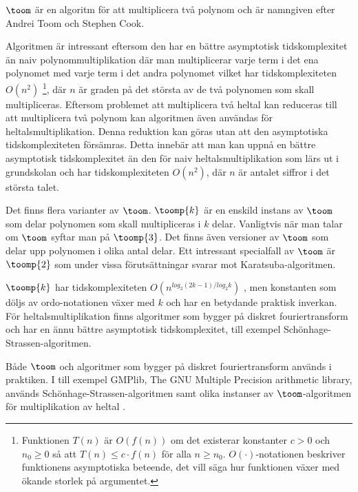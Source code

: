 $\toom$ är en algoritm för att multiplicera två polynom och är namngiven efter
Andrei Toom och Stephen Cook.

Algoritmen är intressant eftersom den har en bättre asymptotisk tidskomplexitet
än naiv polynommultiplikation där man multiplicerar varje term i det ena
polynomet med varje term i det andra polynomet vilket har tidskomplexiteten
$O\left(n^2\right)$ \footnote{Funktionen $T(n)$ är $O(f(n))$ om det existerar
konstanter $c > 0$ och $n_0 \geq 0$ så att $T(n) \leq c \cdot f(n)$ för alla $n
\geq n_0$. $O(\cdot )$-notationen beskriver funktionens asymptotiska beteende,
det vill säga hur funktionen växer med ökande storlek på argumentet.}, där $n$
är graden på det största av de två polynomen som skall multipliceras. Eftersom
problemet att multiplicera två heltal kan reduceras till att multiplicera två
polynom kan algoritmen även användas för heltalsmultiplikation. Denna reduktion
kan göras utan att den asymptotiska tidskomplexiteten försämras. Detta innebär
att man kan uppnå en bättre asymptotisk tidskomplexitet än den för naiv
heltalsmultiplikation som lärs ut i grundskolan och har tidskomplexiteten
$O\left(n^2\right)$, där $n$ är antalet siffror i det största talet.

Det finns flera varianter av $\toom$. $\toomp{k}$ är en enskild instans av
$\toom$ som delar polynomen som skall multipliceras i $k$ delar. Vanligtvis när
man talar om $\toom$ syftar man på $\toomp{3}$. Det finns även versioner av
$\toom$ som delar upp polynomen i olika antal delar. Ett intressant specialfall
av $\toom$ är $\toomp{2}$ som under vissa förutsättningar svarar mot
Karatsuba-algoritmen.

$\toomp{k}$ har tidskomplexiteten $O(n^{log_2(2 k-1)/log_2 k})$
\cite{bodrato2007towards}, men konstanten som döljs av ordo-notationen växer
med $k$ och har en betydande praktisk inverkan. För heltalsmultiplikation
finns algoritmer som bygger på diskret fouriertransform och har en ännu bättre
asymptotisk tidskomplexitet, till exempel Schönhage-Strassen-algoritmen.

Både $\toom$ och algoritmer som bygger på diskret fouriertransform används i
praktiken. I till exempel GMPlib, The GNU Multiple Precision arithmetic
library, används Schönhage-Strassen-algoritmen samt olika instanser av
$\toom$-algoritmen för multiplikation av heltal \cite{gmpdoc}.
